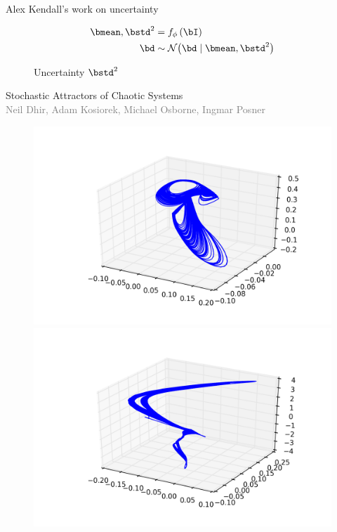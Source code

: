 \documentclass{beamer}
\begin{document}
\begin{frame}{Alex Kendall's work on uncertainty}
\begin{figure}
\begin{minipage}{0.45\textwidth}
				\caption{Uncertainty $\bstd^2$}
			\end{minipage}
			\hfill
			\begin{minipage}{0.45\textwidth}
				\begin{equation*}
					\begin{aligned}
						\bmean, \bstd^2 &= f_\phi \left( \bI \right)\\
						\bd &\sim \gauss{\bd \mid \bmean, \bstd^2}
					\end{aligned}
				\end{equation*}
			\end{minipage}
		\end{figure}

	\end{frame}

	\begin{frame}{Stochastic Attractors of Chaotic Systems\\ \textcolor{gray}{\tiny{Neil Dhir, Adam Kosiorek, Michael Osborne, Ingmar Posner}}}
				\begin{figure}
			\centering
			\begin{minipage}{0.45\textwidth}
				\includegraphics[width=\textwidth]{attractor4}
			\end{minipage}
			\hfill
			\begin{minipage}{0.45\textwidth}
				\includegraphics[width=\textwidth]{attractor5}

\end{minipage}
\end{figure}
\end{frame}
\end{document}
